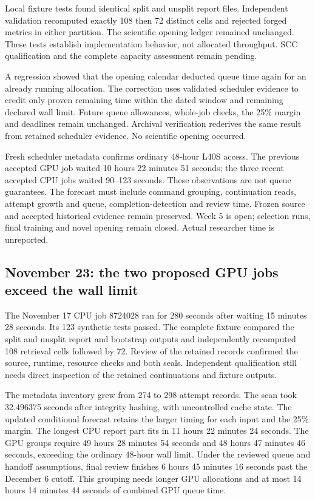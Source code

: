 Local fixture tests found identical split and unsplit report files. Independent
validation recomputed exactly 108 then 72 distinct cells and rejected forged
metrics in either partition. The scientific opening ledger remained unchanged.
These tests establish implementation behavior, not allocated throughput.
SCC qualification and the complete capacity assessment remain pending.

A regression showed that the opening calendar deducted queue time again for
an already running allocation. The correction uses validated scheduler evidence
to credit only proven remaining time within the dated window and remaining
declared wall limit. Future queue allowances, whole-job checks, the 25\% margin
and deadlines remain unchanged. Archival verification rederives the same result
from retained scheduler evidence. No scientific opening occurred.

Fresh scheduler metadata confirms ordinary 48-hour L40S access. The previous
accepted GPU job waited 10 hours 22 minutes 51 seconds; the three recent accepted
CPU jobs waited 90--123 seconds. These observations are not queue guarantees.
The forecast must include command grouping, continuation reads, attempt growth
and queue, completion-detection and review time. Frozen source and accepted
historical evidence remain preserved. Week 5 is open; selection runs, final
training and novel opening remain closed. Actual researcher time is unreported.

\subsection*{November 23: the two proposed GPU jobs exceed the wall limit}

The November 17 CPU job 8724028 ran for 280 seconds after waiting 15 minutes
28 seconds. Its 123 synthetic tests passed. The complete fixture compared
the split and unsplit report and bootstrap outputs and independently recomputed
108 retrieval cells followed by 72. Review of the retained records confirmed
the source, runtime, resource checks and both seals. Independent qualification
still needs direct inspection of the retained continuations and fixture outputs.

The metadata inventory grew from 274 to 298 attempt records. The scan took
32.496375 seconds after integrity hashing, with uncontrolled cache state. The
updated conditional forecast retains the larger timing for each input and the
25\% margin. The longest CPU report part fits in 11 hours 22 minutes 24 seconds.
The GPU groups require 49 hours 28 minutes 54 seconds and 48 hours 47 minutes
46 seconds, exceeding the ordinary 48-hour wall limit. Under the reviewed
queue and handoff assumptions, final review finishes 6 hours 45 minutes
16 seconds past the December 6 cutoff. This grouping needs longer GPU
allocations and at most 14 hours 14 minutes 44 seconds of combined GPU queue
time.

